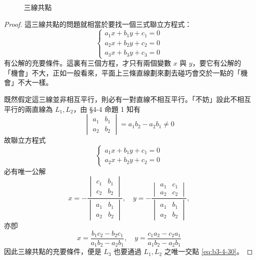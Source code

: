 \begin{figure}[H]
\centering
{}
\caption{三線共點}
\label{fig:4-40}
\end{figure}

\begin{proof}
這三線共點的問題就相當於要找一個三式聯立方程式：
\begin{equation*}
\begin{cases}
a_1 x + b_1 y + c_1 = 0 \\
a_2 x + b_2 y + c_2 = 0 \\
a_3 x + b_3 y + c_3 = 0
\end{cases}
\end{equation*}
有公解的充要條件。這裏有三個方程，才只有兩個變數 $x$ 與 $y$，要它有公解的「機會」不大，正如一般看來，平面上三條直線劃來劃去碰巧會交於一點的「機會」不大一樣。

既然假定這三線並非相互平行，則必有一對直線不相互平行。「不妨」設此不相互平行的兩直線為 $L_1, L_2$，由 \S 4-4 命題 1 知有
\[
\begin{vmatrix}
a_1 & b_1 \\
a_2 & b_2
\end{vmatrix} = a_1 b_2 - a_2 b_1 \neq 0
\]
故聯立方程式
\[
\begin{cases}
a_1 x + b_1 y + c_1 = 0 \\
a_2 x + b_2 y + c_2 = 0
\end{cases}
\]
必有唯一公解
\[
x = -\frac{\begin{vmatrix} c_1 & b_1 \\ c_2 & b_2 \end{vmatrix}}{\begin{vmatrix} a_1 & b_1 \\ a_2 & b_2 \end{vmatrix}}, \quad
y = -\frac{\begin{vmatrix} a_1 & c_1 \\ a_2 & c_2 \end{vmatrix}}{\begin{vmatrix} a_1 & b_1 \\ a_2 & b_2 \end{vmatrix}},
\]
亦卽
\begin{equation}
x = \frac{b_1 c_2 - b_2 c_1}{a_1 b_2 - a_2 b_1}, \quad y = \frac{c_1 a_2 - c_2 a_1}{a_1 b_2 - a_2 b_1}
\label{eq:b3-4-30}
\end{equation}
因此三線共點的充要條件，便是 $L_3$ 也要通過 $L_1, L_2$ 之唯一交點 \eqref{eq:b3-4-30}。


\end{proof}
